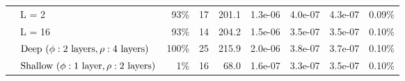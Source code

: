 \begin{tabular}{llrrrrrrr}
          & L = 2 &                        93\% &                       17 &                     201.1 &                                   1.3e-06 &                                 4.0e-07 &                                  4.3e-07 &                                             0.09\% \\
          & L = 16 &                        93\% &                       14 &                     204.2 &                                   1.5e-06 &                                 3.5e-07 &                                  3.5e-07 &                                             0.10\% \\
          & $\textup{Deep}~(\phi:\textup{2 layers},  \rho:\textup{4 layers})$ &                       100\% &                       25 &                     215.9 &                                   2.0e-06 &                                 3.8e-07 &                                  3.7e-07 &                                             0.10\% \\
          & $\textup{Shallow}~(\phi:\textup{1 layer},  \rho:\textup{2 layers})$ &                         1\% &                       16 &                      68.0 &                                   1.6e-07 &                                 3.3e-07 &                                  3.5e-07 &                                             0.10\% \\
\bottomrule
\end{tabular}